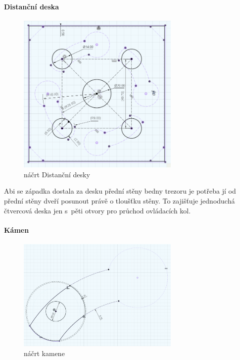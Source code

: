 \newpage

\paragraph{Distanční deska}

\begin{figure}
    \includegraphics[width=0.7\textwidth]{kapitoly/obrazky/M3/distancka.png}
    \caption{náčrt Distanční desky}
    \label{fig:M3-distancka}
\end{figure}

Abi se západka dostala za desku přední stěny bedny trezoru je potřeba jí od přední stěny dveří posunout právě o tloušťku stěny. To zajišťuje jednoduchá čtvercová deska jen s~pěti otvory
pro průchod ovládacích kol.

\paragraph{Kámen} %
\begin{figure}
    \includegraphics[width=0.7\textwidth]{kapitoly/obrazky/M3/kamen.png}
    \caption{náčrt kamene}
    \label{fig:M3-kamen}
\end{figure}

